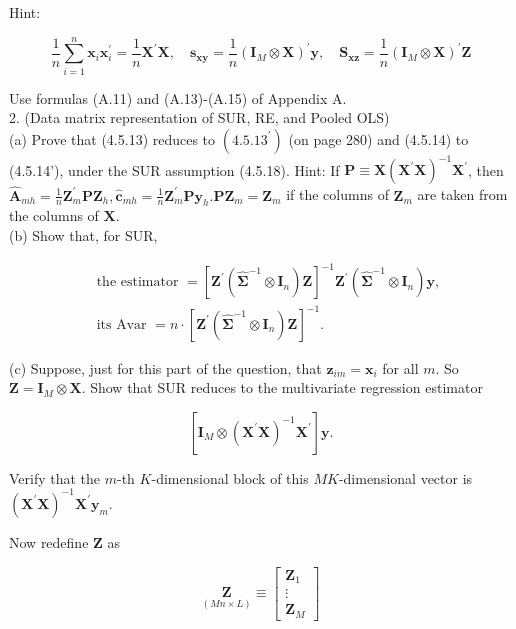 \documentclass[10pt]{article}
\begin{document}
Hint:

$$
\frac{1}{n} \sum_{i=1}^{n} \mathbf{x}_{i} \mathbf{x}_{i}^{\prime}=\frac{1}{n} \mathbf{X}^{\prime} \mathbf{X}, \quad \mathbf{s}_{\mathbf{x y}}=\frac{1}{n}\left(\mathbf{I}_{M} \otimes \mathbf{X}\right)^{\prime} \mathbf{y}, \quad \mathbf{S}_{\mathbf{x z}}=\frac{1}{n}\left(\mathbf{I}_{M} \otimes \mathbf{X}\right)^{\prime} \mathbf{Z}
$$

Use formulas (A.11) and (A.13)-(A.15) of Appendix A.\\
2. (Data matrix representation of SUR, RE, and Pooled OLS)\\
(a) Prove that (4.5.13) reduces to $\left(4.5 .13^{\prime}\right)$ (on page 280) and (4.5.14) to (4.5.14'), under the SUR assumption (4.5.18). Hint: If $\mathbf{P} \equiv \mathbf{X}\left(\mathbf{X}^{\prime} \mathbf{X}\right)^{-1} \mathbf{X}^{\prime}$, then $\widehat{\mathbf{A}}_{m h}=\frac{1}{n} \mathbf{Z}_{m}^{\prime} \mathbf{P} \mathbf{Z}_{h}, \hat{\mathbf{c}}_{m h}=\frac{1}{n} \mathbf{Z}_{m}^{\prime} \mathbf{P} \mathbf{y}_{h} . \mathbf{P} \mathbf{Z}_{m}=\mathbf{Z}_{m}$ if the columns of $\mathbf{Z}_{m}$ are taken from the columns of $\mathbf{X}$.\\
(b) Show that, for SUR,

$$
\begin{aligned}
& \text { the estimator }=\left[\mathbf{Z}^{\prime}\left(\widehat{\mathbf{\Sigma}}^{-1} \otimes \mathbf{I}_{n}\right) \mathbf{Z}\right]^{-1} \mathbf{Z}^{\prime}\left(\widehat{\mathbf{\Sigma}}^{-1} \otimes \mathbf{I}_{n}\right) \mathbf{y}, \\
& \text { its Avar }=n \cdot\left[\mathbf{Z}^{\prime}\left(\widehat{\mathbf{\Sigma}}^{-1} \otimes \mathbf{I}_{n}\right) \mathbf{Z}\right]^{-1} .
\end{aligned}
$$

(c) Suppose, just for this part of the question, that $\mathbf{z}_{i m}=\mathbf{x}_{i}$ for all $m$. So $\mathbf{Z}=\mathbf{I}_{M} \otimes \mathbf{X}$. Show that SUR reduces to the multivariate regression estimator

$$
\left[\mathbf{I}_{M} \otimes\left(\mathbf{X}^{\prime} \mathbf{X}\right)^{-1} \mathbf{X}^{\prime}\right] \mathbf{y} .
$$

Verify that the $m$-th $K$-dimensional block of this $M K$-dimensional vector is $\left(\mathbf{X}^{\prime} \mathbf{X}\right)^{-1} \mathbf{X}^{\prime} \mathbf{y}_{m}$.

Now redefine $\mathbf{Z}$ as

\[
\underset{(M n \times L)}{\mathbf{Z}} \equiv\left[\begin{array}{c}
\mathbf{Z}_{1}  \tag{*}\\
\vdots \\
\mathbf{Z}_{M}
\end{array}\right]
\]
\end{document}
